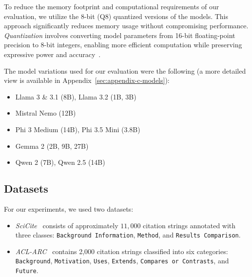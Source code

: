To reduce the memory footprint and computational requirements of our evaluation, we utilize the 8-bit (Q8) quantized versions of the models. This approach significantly reduces memory usage without compromising performance. \textit{Quantization} involves converting model parameters from 16-bit floating-point precision to 8-bit integers, enabling more efficient computation while preserving expressive power and accuracy~\citep{jm3}.


The model variations used for our evaluation were the following (a more detailed view is available in Appendix~\ref{sec:appendix-c-models}):

\begin{itemize}[nosep,topsep=1pt]
    \item Llama 3 \& 3.1 (8B), Llama 3.2 (1B, 3B)
    \item Mistral Nemo (12B)
    \item Phi 3 Medium (14B), Phi 3.5 Mini (3.8B)
    \item Gemma 2 (2B, 9B, 27B)
    \item Qwen 2 (7B), Qwen 2.5 (14B)
\end{itemize}

\subsection{Datasets}\label{sec:datasets}
For our experiments, we used two datasets:

\begin{itemize}[nosep,topsep=1pt]
    \item \textit{SciCite}~\citep{CAZ2019} consists of approximately $11,000$ citation strings annotated with three classes: \texttt{Background Information}, \texttt{Method}, and \texttt{Results Comparison}. 
    \item \textit{ACL-ARC}~\citep{JKH2018} contains 2,000 citation strings classified into six categories: \texttt{Background}, \texttt{Motivation}, \texttt{Uses}, \texttt{Extends}, \texttt{Compares or Contrasts}, and \texttt{Future}. 
\end{itemize}

